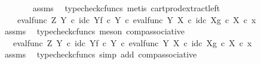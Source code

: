 \begin{isabellebody}
\ \ \ \ \ \ \isamarkupfalse%
\ assms\ \isamarkupfalse%
\ {\isacharparenleft}{\kern0pt}typecheck{\isacharunderscore}{\kern0pt}cfuncs{\isacharcomma}{\kern0pt}\ metis\ cart{\isacharunderscore}{\kern0pt}prod{\isacharunderscore}{\kern0pt}extract{\isacharunderscore}{\kern0pt}left{\isacharparenright}{\kern0pt}\isanewline
\ \ \ \ \isamarkupfalse%
\ \isamarkupfalse%
\ {\isachardoublequoteopen}{\isachardot}{\kern0pt}{\isachardot}{\kern0pt}{\isachardot}{\kern0pt}\ {\isacharequal}{\kern0pt}\ \ {\isacharparenleft}{\kern0pt}eval{\isacharunderscore}{\kern0pt}func\ Z\ Y\ {\isasymcirc}\isactrlsub c\ {\isasymlangle}id\isactrlsub c\ Y{\isacharcomma}{\kern0pt}f\ {\isasymcirc}\isactrlsub c\ {\isasymbeta}\isactrlbsub Y\isactrlesub {\isasymrangle}{\isacharparenright}{\kern0pt}\ {\isasymcirc}\isactrlsub c\ eval{\isacharunderscore}{\kern0pt}func\ Y\ X\ {\isasymcirc}\isactrlsub c\ {\isasymlangle}id\isactrlsub c\ X{\isacharcomma}{\kern0pt}g\ {\isasymcirc}\isactrlsub c\ {\isasymbeta}\isactrlbsub X\isactrlesub {\isasymrangle}\ {\isasymcirc}\isactrlsub c\ x{\isachardoublequoteclose}\isanewline
\ \ \ \ \ \ \isamarkupfalse%
\ assms\ \isamarkupfalse%
\ {\isacharparenleft}{\kern0pt}typecheck{\isacharunderscore}{\kern0pt}cfuncs{\isacharcomma}{\kern0pt}\ meson\ comp{\isacharunderscore}{\kern0pt}associative{}{\isacharparenright}{\kern0pt}\isanewline
\ \ \ \ \isamarkupfalse%
\ \isamarkupfalse%
\ {\isachardoublequoteopen}{\isachardot}{\kern0pt}{\isachardot}{\kern0pt}{\isachardot}{\kern0pt}\ {\isacharequal}{\kern0pt}\ {\isacharparenleft}{\kern0pt}{\isacharparenleft}{\kern0pt}eval{\isacharunderscore}{\kern0pt}func\ Z\ Y\ {\isasymcirc}\isactrlsub c\ {\isasymlangle}id\isactrlsub c\ Y{\isacharcomma}{\kern0pt}f\ {\isasymcirc}\isactrlsub c\ {\isasymbeta}\isactrlbsub Y\isactrlesub {\isasymrangle}{\isacharparenright}{\kern0pt}\ {\isasymcirc}\isactrlsub c\ eval{\isacharunderscore}{\kern0pt}func\ Y\ X\ {\isasymcirc}\isactrlsub c\ {\isasymlangle}id\isactrlsub c\ X{\isacharcomma}{\kern0pt}g\ {\isasymcirc}\isactrlsub c\ {\isasymbeta}\isactrlbsub X\isactrlesub {\isasymrangle}{\isacharparenright}{\kern0pt}\ {\isasymcirc}\isactrlsub c\ x{\isachardoublequoteclose}\isanewline
\ \ \ \ \ \ \isamarkupfalse%
\ assms\ \isamarkupfalse%
\ {\isacharparenleft}{\kern0pt}typecheck{\isacharunderscore}{\kern0pt}cfuncs{\isacharcomma}{\kern0pt}\ simp\ add{\isacharcolon}{\kern0pt}\ comp{\isacharunderscore}{\kern0pt}associative{}{\isacharparenright}{\kern0pt}\isanewline

\end{isabellebody}
